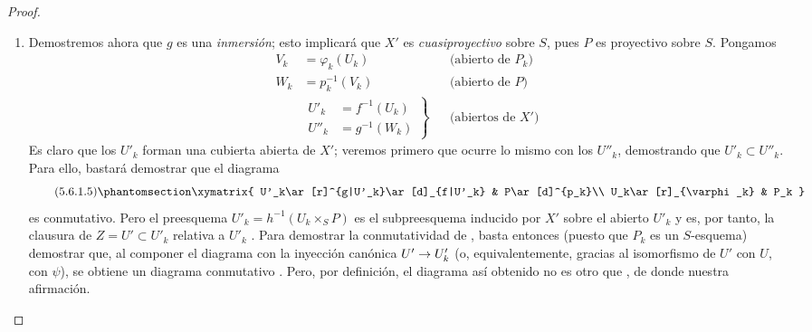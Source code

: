 \documentclass[oneside,10pt]{amsart}
\makeatletter
\newcommand{\ega@arrow}[2]{\mathchoice{#1}{#2}{#2}{#2}}
\renewcommand{\to}{\ega@arrow{\longrightarrow}{\rightarrow}}
\let\EGAOriginalLabel\label
\renewcommand{\label}[1]{\phantomsection\EGAOriginalLabel{#1}}
\makeatother
\begin{document}
\begin{proof}
\begin{enumerate}
  \item[(D)] Demostremos ahora que $g$ es una \emph{inmersión}; esto implicará que $X'$ es \emph{cuasiproyectivo} sobre $S$, pues $P$ es proyectivo sobre $S$.
    Pongamos
    \begin{align*}
V_k&=\varphi_k(U_k) &&\text{(abierto de $P_k$)}\\
W_k&=p_k^{-1}(V_k) &&\text{(abierto de $P$)}\\
&\left.\begin{aligned}U'_k&=f^{-1}(U_k)\\U''_k&=g^{-1}(W_k)\end{aligned}\right\}
&&\text{(abiertos de $X'$)}
\end{align*}
    Es claro que los $U'_k$ forman una cubierta abierta de $X'$; veremos primero que ocurre lo mismo con los $U''_k$, demostrando que $U'_k\subset U''_k$.
    Para ello, bastará demostrar que el diagrama
    \[
\tag{5.6.1.5}
\label{II.5.6.1.5-fr}
\xymatrix{
U'_k\ar[r]^{g|U'_k}\ar[d]_{f|U'_k} & P\ar[d]^{p_k}\\
U_k\ar[r]_{\varphi_k} & P_k
}
\]
    es conmutativo.
    Pero el preesquema $U'_k=h^{-1}(U_k\times_SP)$ es el subpreesquema inducido por $X'$ sobre el abierto $U'_k$ y es, por tanto, la clausura de $Z=U'\subset U'_k$ relativa a $U'_k$ .
    Para demostrar la conmutatividad de , basta entonces (puesto que $P_k$ es un $S$-esquema) demostrar que, al componer el diagrama con la inyección canónica $U'\to U'_k$ (o, equivalentemente, gracias al isomorfismo de $U'$ con $U$, con $\psi$), se obtiene un diagrama conmutativo .
    Pero, por definición, el diagrama así obtenido no es otro que , de donde nuestra afirmación.


\end{enumerate}
\end{proof}
\end{document}

